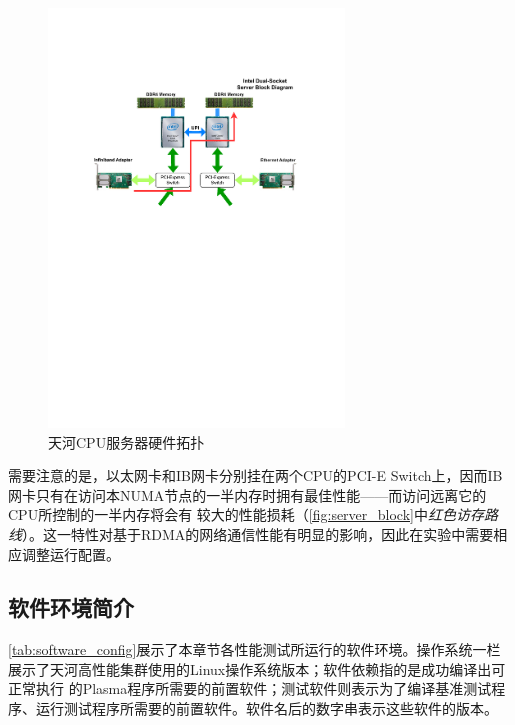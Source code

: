 \begin{figure}[h]
	\centering
	\includegraphics[width=0.7\textwidth]{image/chap04/server_block.pdf}
	\caption{天河CPU服务器硬件拓扑}
	\label{fig:server_block}
\end{figure}

需要注意的是，以太网卡和IB网卡分别挂在两个CPU的PCI-E Switch上，因而IB网卡只有在访问本NUMA节点的一半内存时拥有最佳性能——而访问远离它的CPU所控制的一半内存将会有
较大的性能损耗（\autoref{fig:server_block}中\textit{红色访存路线}）。这一特性对基于RDMA的网络通信性能有明显的影响，因此在实验中需要相应调整运行配置。

\subsection{软件环境简介}

\autoref{tab:software_config}展示了本章节各性能测试所运行的软件环境。操作系统一栏展示了天河高性能集群使用的Linux操作系统版本；软件依赖指的是成功编译出可正常执行
的Plasma程序所需要的前置软件；测试软件则表示为了编译基准测试程序、运行测试程序所需要的前置软件。软件名后的数字串表示这些软件的版本。

